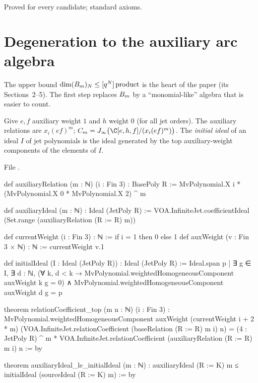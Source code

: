 \begin{status}
Proved for every candidate; standard axioms.
\end{status}

\section{Degeneration to the auxiliary arc algebra}\label{l20:sec:m1}

The upper bound $\dim(B_m)_N\le[q^N]\,\mathrm{product}$ is the heart of the paper (its Sections~2--5). The first
step replaces $B_m$ by a ``monomial-like'' algebra that is easier to count.

\begin{definition}\label{l20:def:aux}
Give $e,f$ auxiliary weight $1$ and $h$ weight $0$ (for all jet orders). The auxiliary relations are
$x_i(ef)^m$; $\ltwentyCm=\ltwentyJ\bigl(\C[e,h,f]/(x_i(ef)^m)\bigr)$. The \emph{initial ideal} of an ideal $I$ of jet
polynomials is the ideal generated by the top auxiliary-weight components of the elements of $I$.
\end{definition}
\noindent File .
\begin{leancode}
def auxiliaryRelation (m : ℕ) (i : Fin 3) : BasePoly R :=
  MvPolynomial.X i * (MvPolynomial.X 0 * MvPolynomial.X 2) ^ m

def auxiliaryIdeal (m : ℕ) : Ideal (JetPoly R) :=
  VOA.InfiniteJet.coefficientIdeal (Set.range (auxiliaryRelation (R := R) m))

def currentWeight (i : Fin 3) : ℕ := if i = 1 then 0 else 1
def auxWeight (v : Fin 3 × ℕ) : ℕ := currentWeight v.1

def initialIdeal (I : Ideal (JetPoly R)) : Ideal (JetPoly R) :=
  Ideal.span {p | ∃ g ∈ I, ∃ d : ℕ,
    (∀ k, d < k → MvPolynomial.weightedHomogeneousComponent auxWeight k g = 0) ∧
      MvPolynomial.weightedHomogeneousComponent auxWeight d g = p}

theorem relationCoefficient_top (m n : ℕ) (i : Fin 3) :
    MvPolynomial.weightedHomogeneousComponent auxWeight (currentWeight i + 2 * m)
      (VOA.InfiniteJet.relationCoefficient (baseRelation (R := R) m i) n) =
        (4 : JetPoly R) ^ m *
          VOA.InfiniteJet.relationCoefficient (auxiliaryRelation (R := R) m i) n := by

theorem auxiliaryIdeal_le_initialIdeal (m : ℕ) :
    auxiliaryIdeal (R := K) m ≤ initialIdeal (sourceIdeal (R := K) m) := by
\end{leancode}
